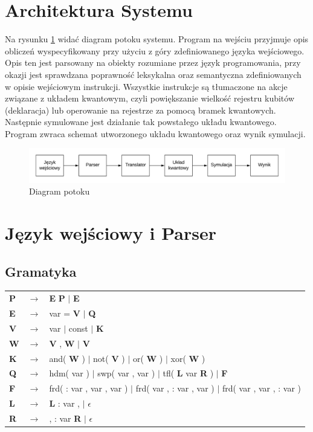 \section{Architektura Systemu}
Na rysunku \ref{fig:potok} widać diagram potoku systemu. Program na wejściu przyjmuje opis obliczeń wyspecyfikowany przy użyciu z góry zdefiniowanego języka wejściowego. Opis ten jest parsowany na obiekty rozumiane przez język programowania, przy okazji jest sprawdzana poprawność leksykalna oraz semantyczna zdefiniowanych w opisie wejściowym instrukcji. Wszystkie instrukcje są tłumaczone na akcje związane z układem kwantowym, czyli powiększanie wielkość rejestru kubitów (deklaracja) lub operowanie na rejestrze za pomocą bramek kwantowych. Następnie symulowane jest działanie tak powstałego układu kwantowego. Program zwraca schemat utworzonego układu kwantowego oraz wynik symulacji.
\begin{figure}[H]
    \includegraphics[width=\linewidth]{systemDiag.png}
    \caption{Diagram potoku}
    \label{fig:potok}
\end{figure}
\section{Język wejściowy i Parser}
\subsection{Gramatyka}
\begin{tabular}{ l c l } 
    \textbf{P} & $\rightarrow$ & \textbf{E} \textbf{P} $|$ \textbf{E} \\ 
    \textbf{E} & $\rightarrow$ & var = \textbf{V} $|$ \textbf{Q} \\ 
    \textbf{V} & $\rightarrow$ & var $|$ const $|$ \textbf{K} \\ 
    \textbf{W} & $\rightarrow$ & \textbf{V} , \textbf{W} $|$ \textbf{V} \\
    \textbf{K} & $\rightarrow$ & and( \textbf{W} ) $|$ not( \textbf{V} ) $|$ or( \textbf{W} ) $|$ xor( \textbf{W} )\\
    \textbf{Q} & $\rightarrow$ & hdm( var ) $|$ swp( var , var ) $|$ tfl( \textbf{L} var \textbf{R} ) $|$ \textbf{F}\\
    \textbf{F} & $\rightarrow$ & frd( : var , var , var ) $|$ frd( var , : var , var ) $|$ frd( var , var , : var )\\
    \textbf{L} & $\rightarrow$ & \textbf{L} : var , $|$ $\epsilon$\\
    \textbf{R} & $\rightarrow$ & , : var \textbf{R} $|$ $\epsilon$\\
\end{tabular}
